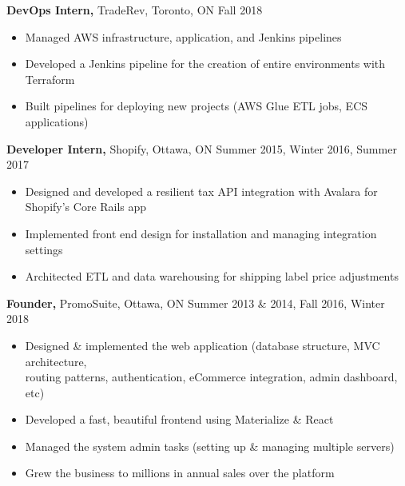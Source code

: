 \documentclass[line, centered]{res}
\begin{document}
\begin{resume}
	{\bf DevOps Intern,} TradeRev, Toronto, ON \hfill Fall 2018\\[-8pt]
	\begin{itemize} \itemsep -1pt  %
		\item Managed AWS infrastructure, application, and Jenkins pipelines
		\item Developed a Jenkins pipeline for the creation of entire environments with Terraform
		\item Built pipelines for deploying new projects (AWS Glue ETL jobs, ECS applications)
	\end{itemize}

	{\bf Developer Intern,} Shopify, Ottawa, ON \hfill Summer 2015, Winter 2016, Summer 2017\\[-8pt]
	\begin{itemize} \itemsep -1pt  %
		\item Designed and developed a resilient tax API integration with Avalara for Shopify's Core Rails app
		\item Implemented front end design for installation and managing integration settings
		\item Architected ETL and data warehousing for shipping label price adjustments
	\end{itemize}

	{\bf Founder,} PromoSuite, Ottawa, ON \hfill Summer 2013 \& 2014, Fall 2016, Winter 2018\\[-8pt]
	\begin{itemize} \itemsep -1pt  %
		\item Designed \& implemented the web application (database structure, MVC architecture,\\
		      routing patterns, authentication, eCommerce integration, admin dashboard, etc)
		\item Developed a fast, beautiful frontend using Materialize \& React
		\item Managed the system admin tasks (setting up \& managing multiple servers)
		\item Grew the business to millions in annual sales over the platform
	\end{itemize}


\end{resume}
\end{document}
